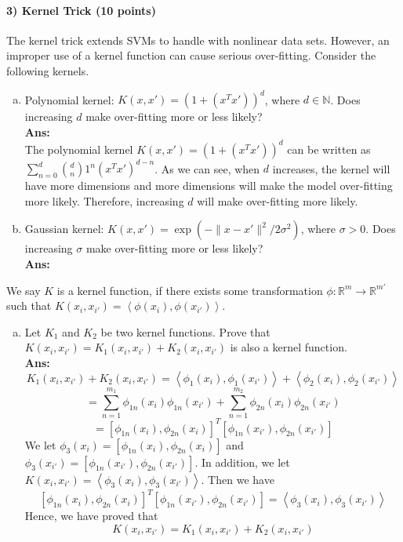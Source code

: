 \documentclass[11pt]{article}
\begin{document}
\paragraph{3) Kernel Trick (10 points)}
The kernel trick extends SVMs to handle with nonlinear data sets. However, an improper use of a kernel function can cause serious over-fitting. Consider the following kernels.
\begin{enumerate}[(a)]
\item Polynomial kernel: $K(x, x') = (1 + (x^Tx'))^d$, where  $d\in\mathbb{N}$. Does increasing $d$ make over-fitting more or less likely?\\
\textbf{Ans:}\\
The polynomial kernel $K(x, x') = (1 + (x^Tx'))^d$ can be written as $\sum_{n=0}^{d}{d \choose n}1^n(x^Tx')^{d-n}$. As we can see, when $d$ increases, the kernel will have more dimensions and more dimensions will make the model over-fitting more likely. Therefore, increasing $d$ will make over-fitting more likely.\\

\item Gaussian kernel: $K(x, x') = \exp(-\|x-x'\|^2 / 2 \sigma^2)$, where $\sigma>0$. Does increasing $\sigma$ make over-fitting more or less likely?\\
\textbf{Ans:}\\


\end{enumerate}
We say $K$ is a kernel function, if there exists some transformation $\phi:\mathbb{R}^m\rightarrow \mathbb{R}^{m'}$ such that $K(x_i,x_{i'}) = \left<\phi(x_i),\phi(x_{i'})\right>$.
\begin{enumerate}[(c)]
\item Let $K_1$ and $K_2$ be two kernel functions. Prove that $K(x_i,x_{i'}) = K_1(x_i,x_{i'}) + K_2(x_i,x_{i'})$ is also a kernel function.\\
\textbf{Ans:}
$$K_1(x_i, x_{i'}) + K_2(x_i, x_{i'}) 
= \left<\phi_1(x_i),\phi_1(x_{i'})\right> + \left<\phi_2(x_i),\phi_2(x_{i'})\right>$$
%
$$= \sum_{n=1}^{m_1}\phi_{1n}(x_i)\phi_{1n}(x_{i'}) + \sum_{n=1}^{m_2}\phi_{2n}(x_i)\phi_{2n}(x_{i'})$$
%
$$= [\phi_{1n}(x_i), \phi_{2n}(x_i)]^T[\phi_{1n}(x_{i'}), \phi_{2n}(x_{i'})]$$
%
We let $\phi_3(x_i) = [\phi_{1n}(x_i), \phi_{2n}(x_i)]$ and $\phi_3(x_{i'}) = [\phi_{1n}(x_{i'}), \phi_{2n}(x_{i'})]$. In addition, we let $K(x_i, x_{i'}) = \left<\phi_3(x_i), \phi_3(x_{i'})\right>$. Then we have
$$[\phi_{1n}(x_i), \phi_{2n}(x_i)]^T[\phi_{1n}(x_{i'}), \phi_{2n}(x_{i'})] = \left<\phi_3(x_i), \phi_3(x_{i'})\right>$$
Hence, we have proved that 
$$K(x_i,x_{i'}) = K_1(x_i,x_{i'}) + K_2(x_i,x_{i'})$$

\end{enumerate}
\end{document}
